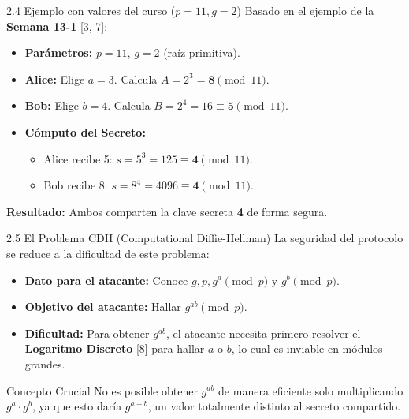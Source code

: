 \documentclass{beamer}
\begin{document}
\begin{frame}{2.4 Ejemplo con valores del curso ($p=11, g=2$)}
    Basado en el ejemplo de la \textbf{Semana 13-1} [3, 7]:
    \begin{itemize}
        \item \textbf{Parámetros:} $p=11$, $g=2$ (raíz primitiva).
        \item \textbf{Alice:} Elige $a=3$. Calcula $A = 2^3 = \mathbf{8} \pmod{11}$.
        \item \textbf{Bob:} Elige $b=4$. Calcula $B = 2^4 = 16 \equiv \mathbf{5} \pmod{11}$.
        \item \textbf{Cómputo del Secreto:}
        \begin{itemize}
            \item Alice recibe 5: $s = 5^3 = 125 \equiv \mathbf{4} \pmod{11}$.
            \item Bob recibe 8: $s = 8^4 = 4096 \equiv \mathbf{4} \pmod{11}$.
        \end{itemize}
    \end{itemize}
    \textbf{Resultado:} Ambos comparten la clave secreta \textbf{4} de forma segura.
\end{frame}

\begin{frame}{2.5 El Problema CDH (Computational Diffie-Hellman)}
    La seguridad del protocolo se reduce a la dificultad de este problema:
    
    \begin{itemize}
        \item \textbf{Dato para el atacante:} Conoce $g, p, g^a \pmod p$ y $g^b \pmod p$.
        \item \textbf{Objetivo del atacante:} Hallar $g^{ab} \pmod p$.
        \item \textbf{Dificultad:} Para obtener $g^{ab}$, el atacante necesita primero resolver el \textbf{Logaritmo Discreto} [8] para hallar $a$ o $b$, lo cual es inviable en módulos grandes.
    \end{itemize}
    
    \begin{alertblock}{Concepto Crucial}
        No es posible obtener $g^{ab}$ de manera eficiente solo multiplicando $g^a \cdot g^b$, ya que esto daría $g^{a+b}$, un valor totalmente distinto al secreto compartido.
    \end{alertblock}
\end{frame}
\end{document}
